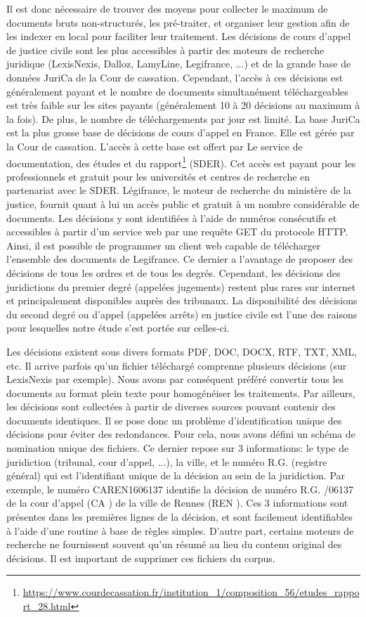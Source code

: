  Il est donc nécessaire de trouver des moyens pour collecter le maximum de documents bruts non-structurés, les pré-traiter, et organiser leur gestion afin de les indexer en local pour faciliter leur traitement. Les décisions de cours d'appel de justice civile sont les plus accessibles à partir des moteurs de recherche juridique (LexisNexis, 
Dalloz, LamyLine, Legifrance, ...) et de la grande base de données JuriCa de la Cour de cassation. Cependant, l'accès à ces décisions est généralement payant et le nombre de documents simultanément téléchargeables est très faible sur les sites payants (généralement 10 à 20 décisions au maximum à la fois). De plus, le nombre de téléchargements par jour est limité. La base JuriCa est la plus grosse base de décisions de cours d'appel en France. Elle est gérée par la Cour de cassation. L'accès à cette base est offert par Le service de documentation, des études et du rapport\footnote{\url{https://www.courdecassation.fr/institution_1/composition_56/etudes_rapport_28.html}} (SDER). Cet accès est payant pour les professionnels et gratuit pour les universités et centres de recherche en partenariat avec le SDER. Légifrance, le moteur de recherche du ministère de la justice, fournit quant à lui un accès public et gratuit à un nombre considérable de documents. Les décisions y sont identifiées à l'aide de numéros consécutifs et accessibles à partir d'un service web par une requête GET du protocole HTTP. Ainsi, il est possible de programmer un client web capable de télécharger l'ensemble des documents de Legifrance. Ce dernier a l'avantage de proposer des décisions de tous les ordres et de tous les degrés. Cependant, les décisions des juridictions du premier degré (appelées jugements) restent plus rares sur internet et principalement disponibles auprès des tribunaux.  La disponibilité des décisions du second degré ou d'appel (appelées arrêts) en justice civile est l'une des raisons pour lesquelles notre étude s'est portée sur celles-ci.

Les décisions existent sous divers formats PDF, DOC, DOCX, RTF, TXT, XML, etc. Il arrive parfois qu'un fichier téléchargé comprenne plusieurs décisions (sur LexisNexis par exemple). Nous avons par conséquent préféré convertir tous les documents au format plein texte pour homogénéiser les traitements. Par ailleurs, les décisions sont collectées à partir de diverses sources pouvant contenir des documents identiques. Il se pose donc un problème d'identification unique des décisions pour éviter des redondances. Pour cela, nous avons défini un schéma de nomination unique des fichiers. Ce dernier repose sur 3 informations: le type de juridiction (tribunal, cour d'appel, ...), la ville, et le numéro R.G. (registre général) qui est l'identifiant unique de la décision au sein de la juridiction. Par exemple, le numéro \og CAREN1606137 \fg{} identifie la décision de numéro R.G. /06137 \fg{} de la cour d'appel (\og CA \fg{}) de la ville de Rennes (\og REN \fg{}). Ces 3 informations sont présentes dans les premières lignes de la décision, et sont facilement identifiables à l'aide d'une routine à base de règles simples. D'autre part, certains moteurs de recherche ne fournissent souvent qu'un résumé au lieu du contenu original des décisions. Il est important de supprimer ces fichiers du corpus.

